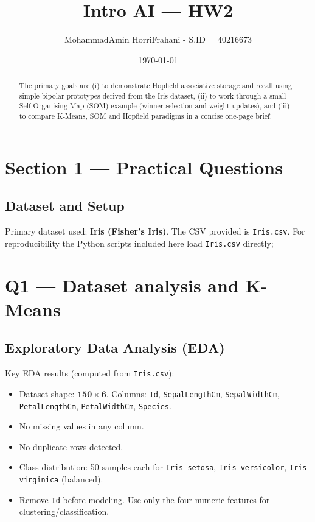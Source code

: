 \documentclass[11pt,a4paper]{article}
\title{Intro AI — HW2}
\author{MohammadAmin HorriFrahani - S.ID = 40216673}
\date{\today}
\begin{document}
\maketitle
\begin{abstract}
 The primary goals are (i) to demonstrate Hopfield associative storage and recall using simple bipolar prototypes derived from the Iris dataset, (ii) to work through a small Self-Organising Map (SOM) example (winner selection and weight updates), and (iii) to compare K-Means, SOM and Hopfield paradigms in a concise one-page brief.


\end{abstract}

\tableofcontents
\newpage

\section{Section 1 — Practical Questions}
\subsection*{Dataset and Setup}
Primary dataset used: \textbf{Iris (Fisher's Iris)}. The CSV provided is \texttt{Iris.csv}. For reproducibility the Python scripts included here load \texttt{Iris.csv} directly; 

\section{Q1 — Dataset analysis and K-Means }
\label{sec:q1}


\subsection{Exploratory Data Analysis (EDA)}
Key EDA results (computed from \texttt{Iris.csv}):

\begin{itemize}
  \item Dataset shape: \(\mathbf{150 \times 6}\). Columns: \texttt{Id}, \texttt{SepalLengthCm}, \texttt{SepalWidthCm}, \texttt{PetalLengthCm}, \texttt{PetalWidthCm}, \texttt{Species}.
  \item No missing values in any column.
  \item No duplicate rows detected.
  \item Class distribution: 50 samples each for \texttt{Iris-setosa}, \texttt{Iris-versicolor}, \texttt{Iris-virginica} (balanced).
  \item Remove \texttt{Id} before modeling. Use only the four numeric features for clustering/classification.
\end{itemize}
\end{document}
